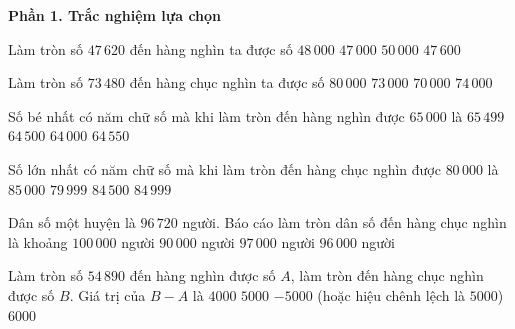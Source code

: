 \textbf{Phần 1. Trắc nghiệm lựa chọn}

\begin{ex} %
Làm tròn số $47\,620$ đến hàng nghìn ta được số
\choice
{\True $48\,000$}
{$47\,000$}
{$50\,000$}
{$47\,600$}
\end{ex}

\begin{ex} %
Làm tròn số $73\,480$ đến hàng chục nghìn ta được số
\choice
{$80\,000$}
{$73\,000$}
{\True $70\,000$}
{$74\,000$}
\end{ex}

\begin{ex} %
Số bé nhất có năm chữ số mà khi làm tròn đến hàng nghìn được $65\,000$ là
\choice
{$65\,499$}
{\True $64\,500$}
{$64\,000$}
{$64\,550$}
\end{ex}

\begin{ex} %
Số lớn nhất có năm chữ số mà khi làm tròn đến hàng chục nghìn được $80\,000$ là
\choice
{$85\,000$}
{$79\,999$}
{$84\,500$}
{\True $84\,999$}
\end{ex}

\begin{ex} %
Dân số một huyện là $96\,720$ người. Báo cáo làm tròn dân số đến hàng chục nghìn là khoảng
\choice
{\True $100\,000$ người}
{$90\,000$ người}
{$97\,000$ người}
{$96\,000$ người}
\end{ex}

\begin{ex} %
Làm tròn số $54\,890$ đến hàng nghìn được số $A$, làm tròn đến hàng chục nghìn được số $B$. Giá trị của $B - A$ là
\choice
{$4000$}
{$5000$}
{\True $-5000$ (hoặc hiệu chênh lệch là $5000$)}
{$6000$}
\end{ex}

